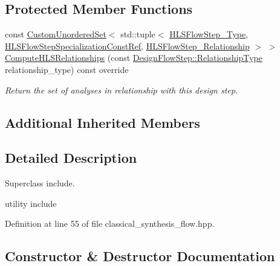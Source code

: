 \subsection*{Protected Member Functions}
\begin{DoxyCompactItemize}
\item 
const \hyperlink{classCustomUnorderedSet}{Custom\+Unordered\+Set}$<$ std\+::tuple$<$ \hyperlink{hls__step_8hpp_ada16bc22905016180e26fc7e39537f8d}{H\+L\+S\+Flow\+Step\+\_\+\+Type}, \hyperlink{hls__step_8hpp_a5fdd2edf290c196531d21d68e13f0e74}{H\+L\+S\+Flow\+Step\+Specialization\+Const\+Ref}, \hyperlink{hls__step_8hpp_a3ad360b9b11e6bf0683d5562a0ceb169}{H\+L\+S\+Flow\+Step\+\_\+\+Relationship} $>$ $>$ \hyperlink{classClassicalHLSSynthesisFlow_a2d0f357853fac7967af1aab06eb0198c}{Compute\+H\+L\+S\+Relationships} (const \hyperlink{classDesignFlowStep_a723a3baf19ff2ceb77bc13e099d0b1b7}{Design\+Flow\+Step\+::\+Relationship\+Type} relationship\+\_\+type) const override
\begin{DoxyCompactList}\small\item\em Return the set of analyses in relationship with this design step. \end{DoxyCompactList}\end{DoxyCompactItemize}
\subsection*{Additional Inherited Members}


\subsection{Detailed Description}
Superclass include. 

utility include 

Definition at line 55 of file classical\+\_\+synthesis\+\_\+flow.\+hpp.



\subsection{Constructor \& Destructor Documentation}
\mbox{\label{classClassicalHLSSynthesisFlow_acc0b6e806e6767a7c63b325f6bc4915c}} 
